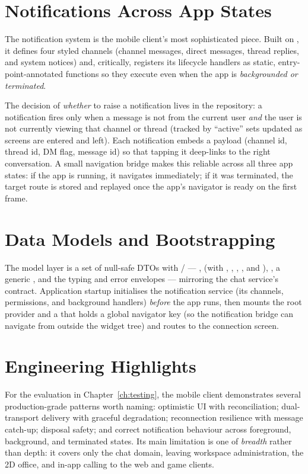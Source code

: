 \section{Notifications Across App States}

The notification system is the mobile client's most sophisticated piece. Built on
, it defines four styled channels (channel messages,
direct messages, thread replies, and system notices) and, critically, registers
its lifecycle handlers as static, entry-point-annotated functions so they execute
even when the app is \emph{backgrounded or terminated}.

The decision of \emph{whether} to raise a notification lives in the repository: a
notification fires only when a message is not from the current user \emph{and} the
user is not currently viewing that channel or thread (tracked by ``active''
sets updated as screens are entered and left). Each notification embeds a payload
(channel id, thread id, DM flag, message id) so that tapping it deep-links to the
right conversation. A small navigation bridge makes this reliable across all three
app states: if the app is running, it navigates immediately; if it was terminated,
the target route is stored and replayed once the app's navigator is ready on the
first frame.

\section{Data Models and Bootstrapping}

The model layer is a set of null-safe DTOs with / ---
,  (with , ,
, , and ),
, a generic , and the typing and
error envelopes --- mirroring the chat service's contract. Application startup
initialises the notification service (its channels, permissions, and background
handlers) \emph{before} the app runs, then mounts the root provider and a
 that holds a global navigator key (so the notification bridge
can navigate from outside the widget tree) and routes to the connection screen.

\section{Engineering Highlights}

For the evaluation in Chapter~\ref{ch:testing}, the mobile client demonstrates
several production-grade patterns worth naming: optimistic UI with
 reconciliation; dual-transport delivery with graceful
degradation; reconnection resilience with message catch-up; disposal safety; and
correct notification behaviour across foreground, background, and terminated
states. Its main limitation is one of \emph{breadth} rather than depth: it covers
only the chat domain, leaving workspace administration, the 2D office, and in-app
calling to the web and game clients.
